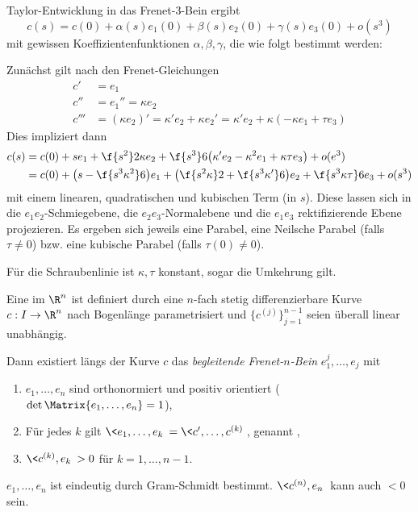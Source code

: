 Taylor-Entwicklung in das Frenet-3-Bein ergibt
\[
	c(s) = c(0) + \alpha(s)e_1(0) + \beta(s) e_2(0) + \gamma(s) e_3(0) + o(s^3)
\]
mit gewissen Koeffizientenfunktionen $\alpha, \beta, \gamma$, die wie folgt bestimmt werden:

Zunächst gilt nach den Frenet-Gleichungen
\begin{align*}
	c' &= e_1 \\
	c'' &= e_1'' = \kappa e_2 \\
	c''' &= (\kappa e_2)' = \kappa' e_2 + \kappa e_2' = \kappa' e_2 + \kappa(-\kappa e_1 + \tau e_3)
\end{align*}
Dies impliziert dann
\begin{align*}
	c(s) &= c(0) + se_1 + \f {s^2}2 \kappa e_2 + \f {s^3}6 \big( \kappa' e_2 - \kappa^2 e_1 + \kappa \tau e_3 \big) + o(e^3) \\
	&= c(0) + \big( s - \f {s^3 \kappa^2}6 \big) e_1 + \big( \f {s^2 \kappa}2 + \f {s^3\kappa'}6 \big) e_2 + \f{s^3 \kappa \tau}6 e_3 + o(s^3)
\end{align*}
mit einem linearen, quadratischen und kubischen Term (in $s$).
Diese lassen sich in die $e_1e_2$-Schmiegebene, die $e_2e_3$-Normalebene und die $e_1e_3$ rektifizierende Ebene projezieren.
Es ergeben sich jeweils eine Parabel, eine Neilsche Parabel (falls $\tau \neq 0$) bzw. eine kubische Parabel (falls $\tau(0) \neq 0$).


Für die Schraubenlinie ist $\kappa, \tau$ konstant, sogar die Umkehrung gilt.




\begin{df}
	Eine  im $\R^n$ ist definiert durch eine $n$-fach stetig differenzierbare Kurve $c:I \to \R^n$ nach Bogenlänge parametrisiert und $\{c^{(j)}\}_{j=1}^{n-1}$ seien überall linear unabhängig.

	Dann existiert längs der Kurve $c$ das \emph{begleitende Frenet-$n$-Bein} $e_1^{j}, \dotsc, e_{j}$ mit
	\begin{enumerate}[1)]
		\item
			$e_1, \dotsc, e_n$ sind orthonormiert und positiv orientiert ($\det \Matrix{e_1, \dotsc, e_n} = 1$),
		\item
			Für jedes $k$ gilt $\<e_1, \dotsc, e_k\> = \<c', \dotsc, c^{(k)}\>$, genannt ,
		\item
			$\<c^{(k)}, e_k\> > 0$ für $k = 1, \dotsc, n-1$.
	\end{enumerate}
	\begin{note}
		$e_1, \dotsc, e_n$ ist eindeutig durch Gram-Schmidt bestimmt.
		$\<c^{(n)}, e_n\>$ kann auch $< 0$ sein.
	\end{note}
\end{df}


